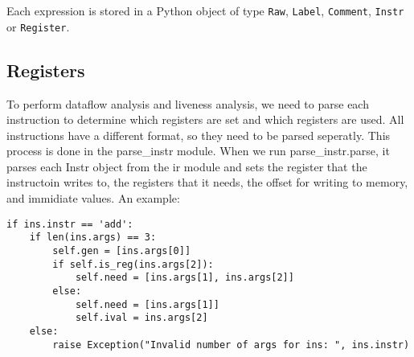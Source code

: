 Each expression is stored in a Python object of type \verb!Raw!, \verb!Label!, \verb!Comment!, \verb!Instr! or \verb!Register!.

\subsection{Registers}
To perform dataflow analysis and liveness analysis, we need to parse each 
instruction to determine which registers are set and which registers are used. 
All instructions have a different format, so they need to be parsed seperatly. 
This process is done in the parse\_instr module. When we run parse\_instr.parse,
it parses each Instr object from the ir module and sets the register that the
instructoin writes to, the registers that it needs, the offset for writing to 
memory, and immidiate values. An example:
\begin{lstlisting}
if ins.instr == 'add':  
    if len(ins.args) == 3:
        self.gen = [ins.args[0]]
        if self.is_reg(ins.args[2]):
            self.need = [ins.args[1], ins.args[2]]
        else: 
            self.need = [ins.args[1]]
            self.ival = ins.args[2]
    else:
        raise Exception("Invalid number of args for ins: ", ins.instr)   
\end{lstlisting}
